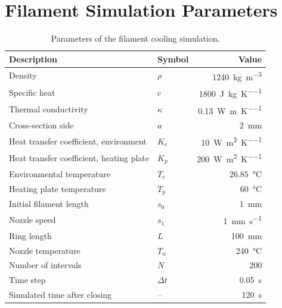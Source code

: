 \section{Filament Simulation Parameters}
\label{app:filament_params}

\begin{table}[H]
  \centering
  \caption{Parameters of the filament cooling simulation.}
  \label{tab:filament_params}
  \begin{tabular}{llr}
    \toprule
    Description & Symbol & Value \\
    \midrule
    Density                           & $\rho$          & \qty{1240}{\kilogram\per\cubic\metre} \\
    Specific heat                     & $c$             & \qty{1800}{\joule\per\kilogram\per\kelvin} \\
    Thermal conductivity              & $\kappa$        & \qty{0.13}{\watt\per\metre\per\kelvin} \\
    Cross-section side                & $a$             & \qty{2}{\milli\metre} \\
    \midrule
    Heat transfer coefficient, environment & $K_e$      & \qty{10}{\watt\per\square\metre\per\kelvin} \\
    Heat transfer coefficient, heating plate & $K_p$    & \qty{200}{\watt\per\square\metre\per\kelvin} \\
    Environmental temperature         & $T_e$           & \qty{26.85}{\degreeCelsius} \\
    Heating plate temperature         & $T_p$           & \qty{60}{\degreeCelsius} \\
    \midrule
    Initial filament length           & $s_0$           & \qty{1}{\milli\metre} \\
    Nozzle speed                      & $s_1$           & \qty{1}{\milli\metre\per\second} \\
    Ring length                       & $L$             & \qty{100}{\milli\metre} \\
    Nozzle temperature                & $T_n$           & \qty{240}{\degreeCelsius} \\
    \midrule
    Number of intervals               & $N$             & 200 \\
    Time step                         & $\Delta t$      & \qty{0.05}{\second} \\
    Simulated time after closing      & --              & \qty{120}{\second} \\
    \bottomrule
  \end{tabular}
\end{table}
